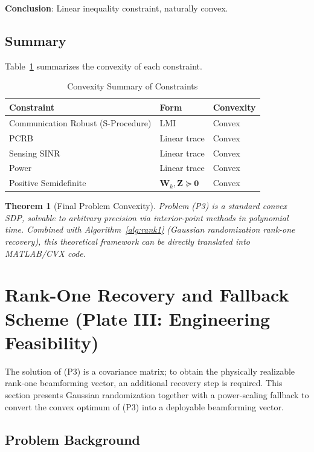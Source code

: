 \documentclass[12pt,a4paper]{article}
\newtheorem{theorem}{Theorem}
\newcommand{\mat}[1]{\mathbf{#1}}
\begin{document}
\textbf{Conclusion}: Linear inequality constraint, naturally convex.

\subsection{Summary}

Table~\ref{tab:convexity} summarizes the convexity of each constraint.

\begin{table}[htbp]
\centering
\caption{Convexity Summary of Constraints}\label{tab:convexity}
\begin{tabular}{lll}
\toprule
Constraint & Form & Convexity \\
\midrule
Communication Robust (S-Procedure) & LMI & Convex \\
PCRB & Linear trace & Convex \\
Sensing SINR & Linear trace & Convex \\
Power & Linear trace & Convex \\
Positive Semidefinite & $\mat{W}_k, \mat{Z} \succeq \mat{0}$ & Convex \\
\bottomrule
\end{tabular}
\end{table}

\begin{theorem}[Final Problem Convexity]
Problem (P3) is a standard convex SDP, solvable to arbitrary precision via interior-point methods in polynomial time. Combined with Algorithm~\ref{alg:rank1} (Gaussian randomization rank-one recovery), this theoretical framework can be directly translated into MATLAB/CVX code.
\end{theorem}

\section{Rank-One Recovery and Fallback Scheme (Plate III: Engineering Feasibility)}

The solution of (P3) is a covariance matrix; to obtain the physically realizable rank-one beamforming vector, an additional recovery step is required. This section presents Gaussian randomization together with a power-scaling fallback to convert the convex optimum of (P3) into a deployable beamforming vector.

\subsection{Problem Background}
\end{document}

